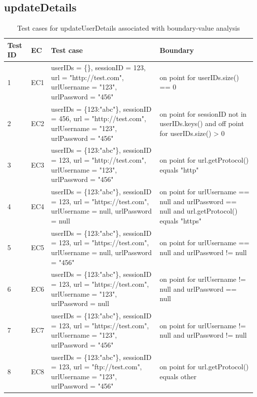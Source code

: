 \documentclass{article}
\begin{document}
\subsection{updateDetails}
\begin{longtable}{|p{0.5cm}|p{0.5cm}|p{7cm}|p{5cm}|}
\caption{Test cases for updateUserDetails associated with boundary-value analysis}\\
\hline 
Test ID&EC&Test case&Boundary\\
\hline  
1&EC1&userIDs = \{\}, sessionID = 123, url = "http://test.com", urlUsername = "123", urlPassword = "456"&on point for userIDs.size() == 0\\
\hline
2&EC2&userIDs = \{123:"abc"\}, sessionID = 456, url = "http://test.com", urlUsername = "123", urlPassword = "456"&on point for sessionID not in userIDs.keys() and off point for userIDs.size() > 0\\
\hline
3&EC3&userIDs = \{123:"abc"\}, sessionID = 123, url = "http://test.com", urlUsername = "123", urlPassword = "456"&on point for url.getProtocol() equals "http"\\
\hline
4&EC4&userIDs = \{123:"abc"\}, sessionID = 123, url = "https://test.com", urlUsername = null, urlPassword = null&on point for urlUsername == null and urlPassword == null and url.getProtocol() equals "https"\\
\hline
5&EC5&userIDs = \{123:"abc"\}, sessionID = 123, url = "https://test.com", urlUsername = null, urlPassword = "456"&on point for urlUsername == null and urlPassword != null\\
\hline
6&EC6&userIDs = \{123:"abc"\}, sessionID = 123, url = "https://test.com", urlUsername = "123", urlPassword = null&on point for urlUsername != null and urlPassword == null\\
\hline
7&EC7&userIDs = \{123:"abc"\}, sessionID = 123, url = "https://test.com", urlUsername = "123", urlPassword = "456"&on point for urlUsername != null and urlPassword != null\\
\hline
8&EC8&userIDs = \{123:"abc"\}, sessionID = 123, url = "ftp://test.com", urlUsername = "123", urlPassword = "456"&on point for url.getProtocol() equals other\\
\hline
\end{longtable}
\end{document}
